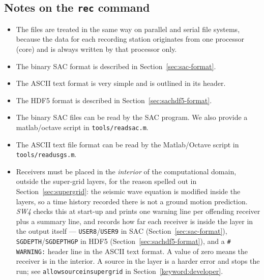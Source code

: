 \documentclass[11pt]{report}
\begin{document}
{\subsection{Notes on the {\tt rec} command}
\begin{itemize}
	\item The files are treated in the same way on parallel and serial file systems, because the data
	      for each recording station originates from one processor (core) and is always written by that processor only.
	\item The binary SAC format is described in Section~\ref{sec:sac-format}.
	\item The ASCII text format is very simple and is outlined in its header.
	\item The HDF5 format is described in Section~\ref{sec:sachdf5-format}.
	\item The binary SAC files can be read by the SAC program. We also provide a matlab/octave script in
		      {\tt tools/readsac.m}.
	\item The ASCII text file format can be read by the Matlab/Octave script in {\tt tools/readusgs.m}.
	\item Receivers must be placed in the {\em interior} of the computational domain, outside the
	      super-grid layers, for the reason spelled out in Section~\ref{sec:supergrid}: the seismic wave
	      equation is modified inside the layers, so a time history recorded there is not a ground
	      motion prediction. \emph{SW4} checks this at start-up and prints one warning line per
	      offending receiver plus a summary line, and records how far each receiver is inside the layer
	      in the output itself --- {\tt USER8}/{\tt USER9} in SAC (Section~\ref{sec:sac-format}),
	      {\tt SGDEPTH}/{\tt SGDEPTHGP} in HDF5 (Section~\ref{sec:sachdf5-format}), and a
	      {\tt \# WARNING:} header line in the ASCII text format. A value of zero means the receiver is
	      in the interior. A source in the layer is a harder error and stops the run; see
	      {\tt allowsourceinsupergrid} in Section~\ref{keyword:developer}.
\end{itemize}

}
\end{document}
